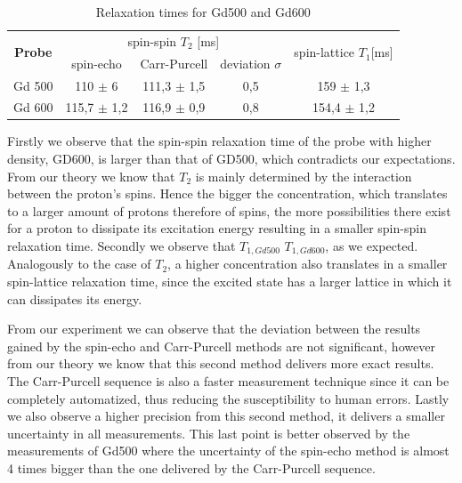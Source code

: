 \begin{table}[!htbp]
 \begin{center}
  \caption{Relaxation times for Gd500 and Gd600}
  \label{tab: relaxation times}
  \begin{tabular}{|c||c|c|c|c|}
	\hline
	\multirow{2}{*}{\textbf{Probe}} & \multicolumn{3}{c}{spin-spin $T_2$ [ms]} &\multirow{2}{*}{ spin-lattice $T_1$[ms]}\\
	& spin-echo & Carr-Purcell & deviation $\sigma$\\
	\hline
	\hline	
	Gd 500 & 110 $\pm$ 6 & 111,3 $\pm$ 1,5 & 0,5 & 159 $\pm$ 1,3 \\
	Gd 600 & 115,7 $\pm$ 1,2 & 116,9 $\pm$ 0,9 & 0,8 & 154,4 $\pm$ 1,2 \\
	\hline
  \end{tabular}
 \end{center}
\end{table}

Firstly we observe that the spin-spin relaxation time of the probe with higher density, GD600, is larger than that of GD500, which contradicts our expectations. From our theory we know that $T_2$ is mainly determined by the interaction between the proton's spins. Hence the bigger the concentration, which translates to a larger amount of protons therefore of spins, the  more possibilities there exist for a proton to dissipate its excitation energy resulting in a smaller spin-spin relaxation time. 
Secondly we observe that $T_{1, Gd500}$ \> $T_{1,Gd600}$, as we expected. Analogously to the case of $T_2$, a higher concentration also translates in a smaller spin-lattice relaxation time, since the excited state has a larger lattice in which it can dissipates its energy.


From our experiment we can observe that the deviation between the results gained by the spin-echo and Carr-Purcell methods are not significant, however from our theory we know that this second method delivers more exact results. The Carr-Purcell sequence is also a faster measurement technique since it can be completely automatized, thus reducing the susceptibility to human errors. Lastly we also observe a higher precision from this second method, it delivers a smaller uncertainty in all measurements. This last point is better observed by the measurements of Gd500 where the uncertainty of the spin-echo method is almost 4 times bigger than the one delivered by the Carr-Purcell sequence. 
